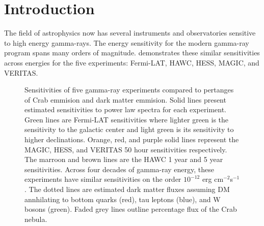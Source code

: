 \section{Introduction} \label{sec:gd_intro}

The field of astrophysics now has several instruments and observatories sensitive to high energy gamma-rays.
The energy sensitivity for the modern gamma-ray program spans many orders of magnitude.
 demonstrates these similar sensitivities across energies for the five experiments: Fermi-LAT, HAWC, HESS, MAGIC, and VERITAS.

\begin{figure}[ht]
    \caption{\ns Sensitivities of five gamma-ray experiments compared to pertanges of Crab emmision and dark matter emmision. Solid lines present estimated sensitivities to power law spectra \fu for each experiment. Green lines are Fermi-LAT sensitivities where lighter green is the sensitivity to the galactic center and light green is its sensitivity to higher declinations. Orange, red, and purple solid lines represent the MAGIC, HESS, and VERITAS 50 hour sensitivities respectively. The marroon and brown lines are the HAWC 1 year and 5 year sensitivities. Across four decades of gamma-ray energy, these experiments have similar sensitivities on the order $10^{-12}$ erg cm$^{-2}$s$^{-1}$. The dotted lines are estimated dark matter fluxes assuming DM annhilating to bottom quarks (red), tau leptons (blue), and W bosons (green). Faded grey lines outline percentage flux of the Crab nebula.}
    \label{fig:gd_motivation}
\end{figure}


